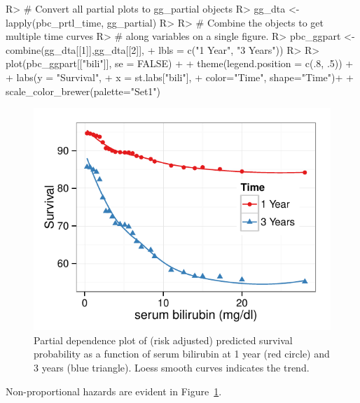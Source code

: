 \documentclass[nojss]{jss}\usepackage[]{graphicx}\usepackage[]{color}
\makeatletter
\def\maxwidth{ %
  \ifdim\Gin@nat@width>\linewidth
    \linewidth
  \else
    \Gin@nat@width
  \fi
}
\makeatother
\begin{document}
\begin{Schunk}
\begin{Sinput}
R> # Convert all partial plots to gg_partial objects
R> gg_dta <- lapply(pbc_prtl_time, gg_partial)
R> 
R> # Combine the objects to get multiple time curves 
R> # along variables on a single figure.
R> pbc_ggpart <- combine(gg_dta[[1]],gg_dta[[2]], 
+                       lbls = c("1 Year", "3 Years"))
R> 
R> plot(pbc_ggpart[["bili"]], se = FALSE) + 
+   theme(legend.position = c(.8, .5)) + 
+   labs(y = "Survival", 
+        x = st.labs["bili"],
+        color="Time", shape="Time")+
+   scale_color_brewer(palette="Set1")
\end{Sinput}
\begin{figure}[!htpb]

{\centering \includegraphics[width=\maxwidth]{figure/rfs-pbc-partial-bili-1} 

}

\caption[Partial dependence plot of (risk adjusted) predicted survival probability as a function of serum bilirubin at 1 year (red circle) and 3 years (blue triangle)]{Partial dependence plot of (risk adjusted) predicted survival probability as a function of serum bilirubin at 1 year (red circle) and 3 years (blue triangle). Loess smooth curves indicates the trend.\label{fig:pbc-partial-bili}}
\end{figure}
\end{Schunk}

Non-proportional hazards are evident in Figure~\ref{fig:pbc-partial-bili}.
\end{document}
